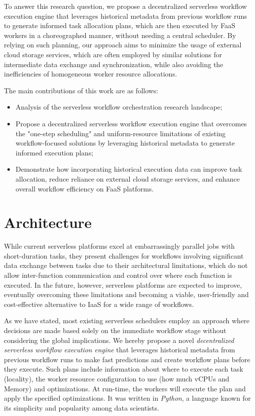 \documentclass[conference]{IEEEtran}
\begin{document}
To answer this research question, we propose a decentralized serverless workflow execution engine that leverages historical metadata from previous workflow runs to generate informed task allocation plans, which are then executed by FaaS workers in a choreographed manner, without needing a central scheduler. By relying on such planning, our approach aims to minimize the usage of external cloud storage services, which are often employed by similar solutions for intermediate data exchange and synchronization, while also avoiding the inefficiencies of homogeneous worker resource allocations.

The main contributions of this work are as follows:
\begin{itemize}
    \item Analysis of the serverless workflow orchestration research landscape;
    \item Propose a decentralized serverless workflow execution engine that overcomes the "one-step scheduling" and uniform-resource limitations of existing workflow-focused solutions by leveraging historical metadata to generate informed execution plans;
    \item Demonstrate how incorporating historical execution data can improve task allocation, reduce reliance on external cloud storage services, and enhance overall workflow efficiency on FaaS platforms.
\end{itemize}



\section{Architecture}
\label{s:architecture}

While current serverless platforms excel at embarrassingly parallel jobs with short-duration tasks, they present challenges for workflows involving significant data exchange between tasks due to their architectural limitations, which do not allow inter-function communication and control over where each function is executed. In the future, however, serverless platforms are expected to improve, eventually overcoming these limitations and becoming a viable, user-friendly and cost-effective alternative to IaaS for a wide range of workflows.

As we have stated, most existing serverless schedulers employ an approach where decisions are made based solely on the immediate workflow stage without considering the global implications. We hereby propose a novel \textit{decentralized serverless workflow execution engine} that leverages historical metadata from previous workflow runs to make fast predictions and create workflow plans before they execute. Such plans include information about where to execute each task (locality), the worker resource configuration to use (how much vCPUs and Memory) and optimizations. At run-time, the workers will execute the plan and apply the specified optimizations. It was written in \textit{Python}, a language known for its simplicity and popularity among data scientists.
\end{document}
